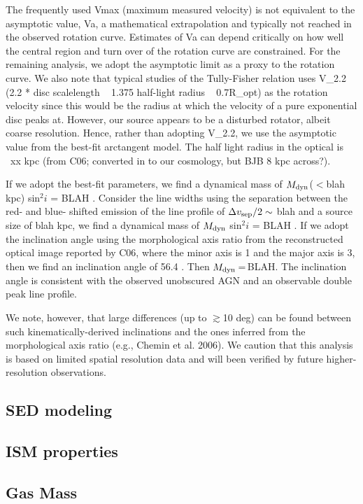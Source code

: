 \documentclass[]{emulateapj}
\begin{document}
The frequently used Vmax (maximum measured velocity) is not equivalent to the
asymptotic value, Va, a mathematical extrapolation and typically not reached in
the observed rotation curve. Estimates of Va can depend critically on how well
the central region and turn over of the rotation curve are constrained. For the
remaining analysis, we adopt the asymptotic limit as a proxy to the rotation
curve. We also note that typical studies of the Tully-Fisher relation uses V_2.2
(2.2 * disc scalelength ~ 1.375 half-light radius ~ 0.7R_opt) as the rotation
velocity since this would be the radius at which the velocity of a pure
exponential disc peaks at. However, our source appears to be a disturbed
rotator, albeit coarse resolution. Hence, rather than adopting V_2.2, we use the
asymptotic value from the best-fit arctangent model. The half light radius in the
optical is ~xx kpc (from C06; converted in to our cosmology, but BJB 8 kpc
across?).


If we adopt the best-fit parameters, we find a dynamical mass of $M_{\rm dyn}$($<$blah kpc) sin$^2 i$ = BLAH \Msun. Consider the line widths using the separation between
the red- and blue- shifted emission of the \bco line profile of $\Delta v_{\rm sep}/2 \sim$ blah \kms and a source size of blah kpc, we find a dynamical mass of $M_{\rm dyn}$
sin$^2 i$ = BLAH \Msun. If we adopt the inclination angle using the morphological axis ratio from the
reconstructed optical image reported by C06, where the minor axis is 1 and the major axis is 3, then we find an inclination angle of 56.4
\degr. Then $M_{\rm dyn}$\,=\,BLAH. The inclination angle is consistent with the observed unobscured AGN and an observable double peak line profile.

We note, however, that large differences (up to $\gtrsim$10 deg) can be found between such kinematically-derived inclinations and the ones inferred from the morphological
axis ratio (e.g., Chemin et al. 2006). We caution that this analysis is based on limited spatial resolution data and will been verified by future higher-resolution observations.

\subsection{SED modeling}
\subsection{ISM properties}
\subsection{Gas Mass}
\end{document}
